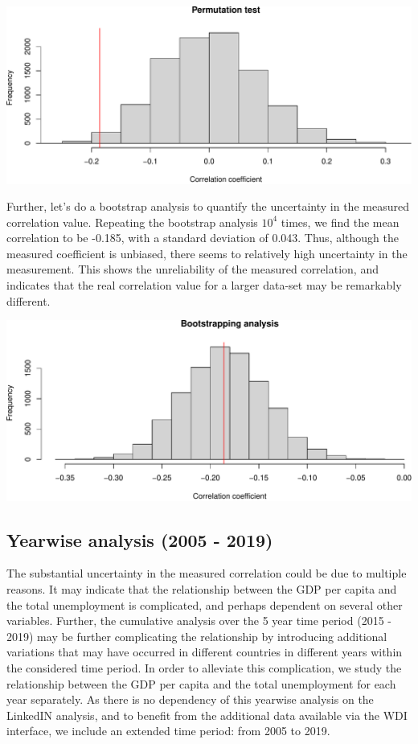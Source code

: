 \documentclass[
]{article}
\begin{document}
\includegraphics{main_files/figure-latex/permutation_plot-1.pdf}

Further, let's do a bootstrap analysis to quantify the uncertainty in
the measured correlation value. Repeating the bootstrap analysis
\ensuremath{10^{4}} times, we find the mean correlation to be -0.185,
with a standard deviation of 0.043. Thus, although the measured
coefficient is unbiased, there seems to relatively high uncertainty in
the measurement. This shows the unreliability of the measured
correlation, and indicates that the real correlation value for a larger
data-set may be remarkably different.

\includegraphics{main_files/figure-latex/unnamed-chunk-8-1.pdf}

\hypertarget{yearwise-analysis-2005---2019}{%
\subsection{Yearwise analysis (2005 -
2019)}\label{yearwise-analysis-2005---2019}}

The substantial uncertainty in the measured correlation could be due to
multiple reasons. It may indicate that the relationship between the GDP
per capita and the total unemployment is complicated, and perhaps
dependent on several other variables. Further, the cumulative analysis
over the 5 year time period (2015 - 2019) may be further complicating
the relationship by introducing additional variations that may have
occurred in different countries in different years within the considered
time period. In order to alleviate this complication, we study the
relationship between the GDP per capita and the total unemployment for
each year separately. As there is no dependency of this yearwise
analysis on the LinkedIN analysis, and to benefit from the additional
data available via the WDI interface, we include an extended time
period: from 2005 to 2019.
\end{document}
